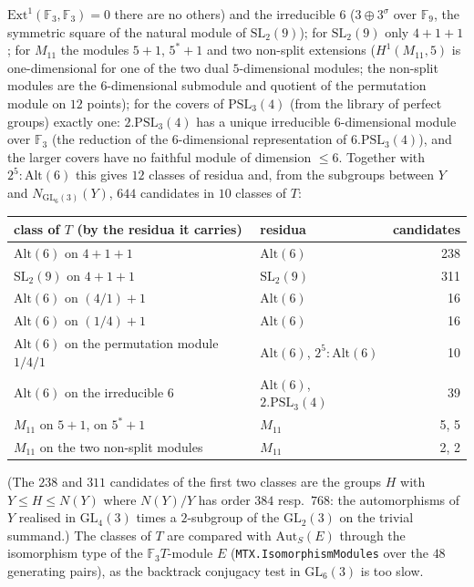 \documentclass[11pt]{article}
\theoremstyle{definition}
\theoremstyle{remark}
\newcommand{\Aut}{\mathrm{Aut}}
\newcommand{\GL}{\mathrm{GL}}
\newcommand{\SL}{\mathrm{SL}}
\newcommand{\PSL}{\mathrm{PSL}}
\newcommand{\Alt}{\mathrm{Alt}}
\begin{document}
$\mathrm{Ext}^1(\mathbb{F}_3,\mathbb{F}_3)=0$ there are no others) and the
irreducible $6$ ($3\oplus3^\sigma$ over $\mathbb{F}_9$, the symmetric square
of the natural module of $\SL_2(9)$); for $\SL_2(9)$ only $4+1+1$; for
$M_{11}$ the modules $5+1$, $5^*+1$ and two non-split extensions
($H^1(M_{11},5)$ is one-dimensional for one of the two dual
$5$-dimensional modules; the non-split modules are the $6$-dimensional
submodule and quotient of the permutation module on $12$ points); for the
covers of $\PSL_3(4)$ (from the library of perfect groups) exactly one:
$2.\PSL_3(4)$ has a unique irreducible $6$-dimensional module over
$\mathbb{F}_3$ (the reduction of the $6$-dimensional representation of
$6.\PSL_3(4)$), and the larger covers have no faithful module of dimension
$\le6$.  Together with $2^5{:}\Alt(6)$ this gives $12$ classes of residua
and, from the subgroups between $Y$ and $N_{\GL_6(3)}(Y)$, $644$ candidates
in $10$ classes of $T$:
\begin{center}
\begin{tabular}{llr}
\toprule
class of $T$ (by the residua it carries) & residua & candidates\\
\midrule
$\Alt(6)$ on $4+1+1$ & $\Alt(6)$ & 238\\
$\SL_2(9)$ on $4+1+1$ & $\SL_2(9)$ & 311\\
$\Alt(6)$ on $(4/1)+1$ & $\Alt(6)$ & 16\\
$\Alt(6)$ on $(1/4)+1$ & $\Alt(6)$ & 16\\
$\Alt(6)$ on the permutation module $1/4/1$ & $\Alt(6)$, $2^5{:}\Alt(6)$ & 10\\
$\Alt(6)$ on the irreducible $6$ & $\Alt(6)$, $2.\PSL_3(4)$ & 39\\
$M_{11}$ on $5+1$, on $5^*+1$ & $M_{11}$ & 5, 5\\
$M_{11}$ on the two non-split modules & $M_{11}$ & 2, 2\\
\bottomrule
\end{tabular}
\end{center}
(The $238$ and $311$ candidates of the first two classes are the groups
$H$ with $Y\le H\le N(Y)$ where $N(Y)/Y$ has order $384$ resp.\ $768$: the
automorphisms of $Y$ realised in $\GL_4(3)$ times a $2$-subgroup of the
$\GL_2(3)$ on the trivial summand.)  The classes of $T$ are compared with
$\Aut_S(E)$ through the isomorphism type of the $\mathbb{F}_3T$-module
$E$ (\texttt{MTX.IsomorphismModules} over the $48$ generating pairs), as the
backtrack conjugacy test in $\GL_6(3)$ is too slow.
\end{document}
